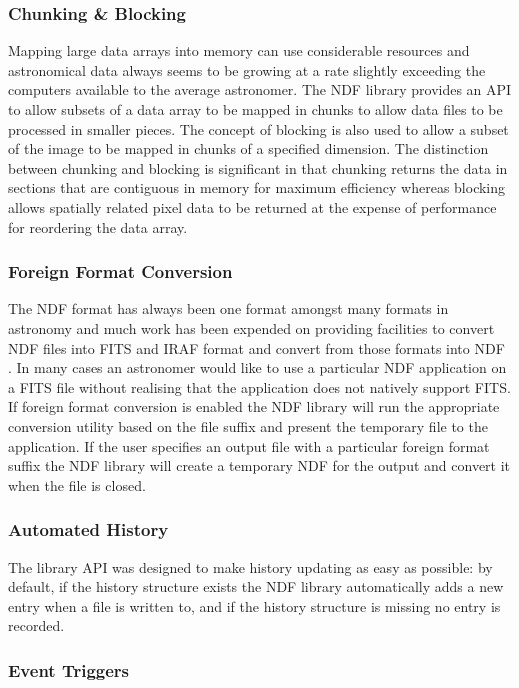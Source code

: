 \documentclass[final,authoryear,5p,times,twocolumn]{elsarticle}
\begin{document}
\subsubsection{Chunking \& Blocking}

Mapping large data arrays into memory can use considerable resources
and astronomical data always seems to be growing at a rate slightly
exceeding the computers available to the average astronomer. The NDF
library provides an API to allow subsets of a data array to be mapped
in chunks to allow data files to be processed in smaller pieces. The
concept of blocking is also used to allow a subset of the image to be
mapped in chunks of a specified dimension. The distinction between
chunking and blocking is significant in that chunking returns the data
in sections that are contiguous in memory for maximum efficiency
whereas blocking allows spatially related pixel data to be returned at
the expense of performance for reordering the data array.

\subsubsection{Foreign Format Conversion}

The NDF format has always been one format amongst many formats in astronomy and much work has been
expended on providing facilities to convert NDF files into FITS and
IRAF format and convert from those formats into NDF \citep{SUN55}. In
many cases an astronomer would like to use a particular NDF
application on a FITS file without realising that the application does
not natively support FITS. If foreign format conversion is enabled the
NDF library will run the appropriate conversion utility based on the
file suffix and present the temporary file to the application. If the
user specifies an output file with a particular foreign format suffix
the NDF library will create a temporary NDF for the output and convert
it when the file is closed.

\subsubsection{Automated History}

The library API was designed to make history updating as easy
as possible: by default, if the history structure exists the NDF
library automatically adds a new entry when a file is written
to, and if the history structure is missing no entry is recorded.

\subsubsection{Event Triggers}
\end{document}
